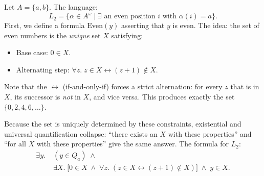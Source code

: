 \begin{example}
\label{ex:s1s-parity}
Let $A = \{a, b\}$.  The language:
\[
  L_2 = \{\alpha \in A^\omega \mid \exists
          \text{ an even position } i \text{ with } \alpha(i) = a\}.
\]
First, we define a formula $\mathrm{Even}(y)$ asserting that $y$ is even.
The idea: the set of even numbers is the \emph{unique} set $X$ satisfying:
\begin{itemize}
  \item Base case: $0 \in X$.
  \item Alternating step: $\forall z.\; z \in X \leftrightarrow (z+1) \notin X$.
\end{itemize}
Note that the $\leftrightarrow$ (if-and-only-if) forces a strict alternation:
for every $z$ that is in $X$, its successor is \emph{not} in $X$, and vice
versa.  This produces exactly the set $\{0, 2, 4, 6, \ldots\}$.

\begin{center}
  \label{fig:s1s-parity-alternation}
\end{center}

Because the set is uniquely determined by these constraints, existential and
universal quantification collapse: ``there exists an $X$ with these
properties'' and ``for all $X$ with these properties'' give the same answer.
The formula for $L_2$:
\begin{align*}
  \exists y.\; &(y \in Q_a) \;\land\\
               &\exists X.\;\bigl[0 \in X \;\land\;
                 \forall z.\; (z \in X \leftrightarrow (z+1) \notin X)\bigr]
               \;\land\; y \in X.
\end{align*}
\end{example}

